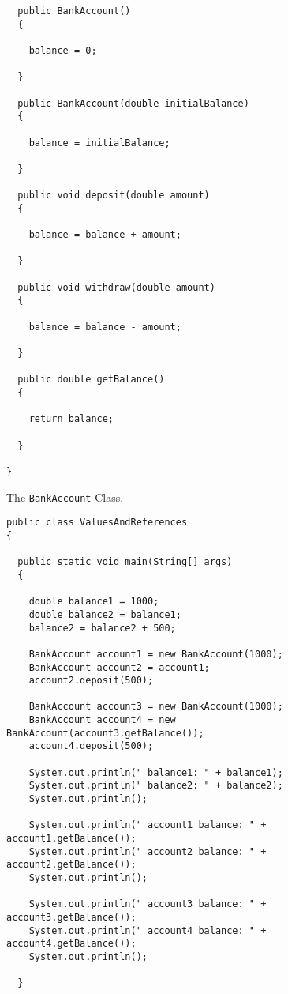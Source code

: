 \documentclass[12pt]{article}
\begin{document}
\begin{enumerate}
\begin{figure}[t]
{\begin{verbatim}
  public BankAccount()
  {

    balance = 0;

  }

  public BankAccount(double initialBalance)
  {

    balance = initialBalance;

  }

  public void deposit(double amount)
  {

    balance = balance + amount;

  }

  public void withdraw(double amount)
  {

    balance = balance - amount;

  }

  public double getBalance()
  {

    return balance;

  }

}
\end{verbatim}
}
\caption{The {\tt BankAccount} Class.}
\label{BankAccount}
\end{figure}

\begin{figure}[t]

\footnotesize{
\begin{verbatim}
public class ValuesAndReferences
{

  public static void main(String[] args)
  {

    double balance1 = 1000;
    double balance2 = balance1;
    balance2 = balance2 + 500;

    BankAccount account1 = new BankAccount(1000);
    BankAccount account2 = account1;
    account2.deposit(500);

    BankAccount account3 = new BankAccount(1000);
    BankAccount account4 = new BankAccount(account3.getBalance());
    account4.deposit(500);

    System.out.println(" balance1: " + balance1);
    System.out.println(" balance2: " + balance2);
    System.out.println();

    System.out.println(" account1 balance: " + account1.getBalance());
    System.out.println(" account2 balance: " + account2.getBalance());
    System.out.println();

    System.out.println(" account3 balance: " + account3.getBalance());
    System.out.println(" account4 balance: " + account4.getBalance());
    System.out.println();

  }


\end{verbatim}}
\end{figure}
\end{enumerate}
\end{document}
